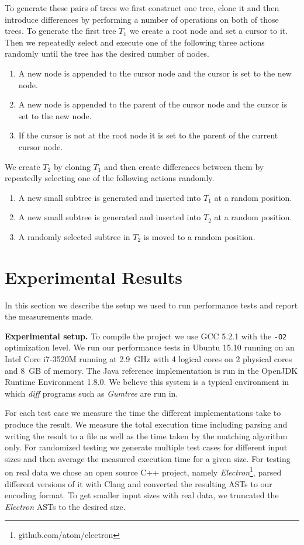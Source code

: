 \documentclass[letterpaper]{article}
\newcommand{\mypar}[1]{{\bf #1.}}
\begin{document}
To generate these pairs of trees we first construct one tree, clone it and then introduce differences by performing a number of operations on both of those trees.
To generate the first tree $T_1$ we create a root node and set a cursor to it.
Then we repeatedly select and execute one of the following three actions randomly until the tree has the desired number of nodes.
\begin{enumerate}
	\item A new node is appended to the cursor node and the cursor is set to the new node.
	\item A new node is appended to the parent of the cursor node and the cursor is set to the new node.
	\item If the cursor is not at the root node it is set to the parent of the current cursor node.
\end{enumerate}
We create $T_2$ by cloning $T_1$ and then create differences between them by repeatedly selecting one of the following actions randomly.
\begin{enumerate}
	\item A new small subtree is generated and inserted into $T_1$ at a random position.
	\item A new small subtree is generated and inserted into $T_2$ at a random position.
	\item A randomly selected subtree in $T_2$ is moved to a random position.
\end{enumerate}

\section{Experimental Results}\label{sec:exp}

In this section we describe the setup we used to run performance tests and report the measurements made.

\mypar{Experimental setup}
To compile the project we use GCC 5.2.1 with the \texttt{-O2} optimization level.
We run our performance tests in Ubuntu 15.10 running on an Intel Core i7-3520M running at 2.9~GHz with 4 logical cores on 2 physical cores and 8~GB of memory.
The Java reference implementation is run in the OpenJDK Runtime Environment 1.8.0.
We believe this system is a typical environment in which \emph{diff} programs such as \emph{Gumtree} are run in.

For each test case we measure the time the different implementations take to produce the result.
We measure the total execution time including parsing and writing the result to a file as well as the time taken by the matching algorithm only.
For randomized testing we generate multiple test cases for different input sizes and then average the measured execution time for a given size.
For testing on real data we chose an open source C++ project, namely \emph{Electron}\footnote{github.com/atom/electron}, parsed different versions of it with Clang and converted the resulting ASTs to our encoding format.
To get smaller input sizes with real data, we truncated the \emph{Electron} ASTs to the desired size.
\end{document}
